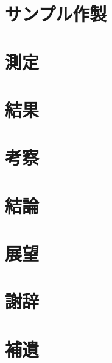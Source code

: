 \documentclass[uplatex,openany,oneside,a4j,11pt]{jsbook}
\begin{document}
\chapter{サンプル作製}
    \begin{abstract}
    \end{abstract}
    

\chapter{測定}
    \begin{abstract}
    \end{abstract}
    

\chapter{結果}
    \begin{abstract}
    \end{abstract}
    

\chapter{考察}
    \begin{abstract}
    \end{abstract}
    

\chapter{結論}
    \begin{abstract}
    \end{abstract}
    

\chapter{展望}
    \begin{abstract}
    \end{abstract}
    

\chapter{謝辞}
    \begin{abstract}
    \end{abstract}
    

\chapter{補遺}
    \begin{abstract}
    \end{abstract}
    
\printbibliography[title=参考文献]
\end{document}
